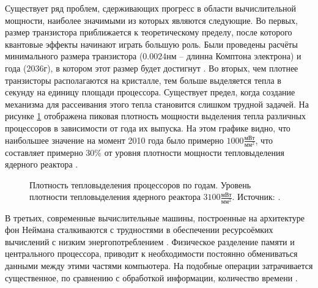 \par
Существует ряд проблем, сдерживающих прогресс в области вычислительной мощности, наиболее значимыми из которых являются следующие. Во первых, размер транзистора приближается к теоретическому пределу, после которого квантовые эффекты начинают играть большую роль. Были проведены расчёты минимального размера транзистора ($0.0024$нм -- длинна Комптона электрона) и года (2036г), в котором этот размер будет достигнут \cite{powell2008quantum}. Во вторых, чем плотнее транзисторы располагаются на кристалле, тем больше выделяется тепла в секунду на единицу площади процессора. Существует предел, когда создание механизма для рассеивания этого тепла становится слишком трудной задачей. На рисунке \ref{ris:WattD} отображена пиковая плотность мощности выделения тепла различных процессоров в зависимости от года их выпуска. На этом графике видно, что наибольшее значение на момент 2010 года было примерно $1000\frac{\text{мВт}}{\text{мм}^2}$, что составляет примерно $30\%$ от уровня плотности мощности тепловыделения ядерного реактора \cite{khan2021advancements}.
\begin{figure}[h!]
	\caption{Плотность тепловыделения процессоров по годам. Уровень плотности тепловыделения ядерного реактора $3100\frac{\text{мВт}}{\text{мм}^2}$. Источник: \cite{danowitz2014exploring}.}
	\label{ris:WattD}
\end{figure}
В третьих, современные вычислительные машины, построенные на архитектуре фон Неймана сталкиваются с трудностями в обеспечении ресурсоёмких вычислений с низким энергопотреблением \cite{indiveri2015memory}. Физическое разделение памяти и центрального процессора, приводит к необходимости постоянно обмениваться данными между этими частями компьютера. На подобные операции затрачивается существенное, по сравнению с обработкой информации, количество времени \cite{mahapatra1999processor}.
